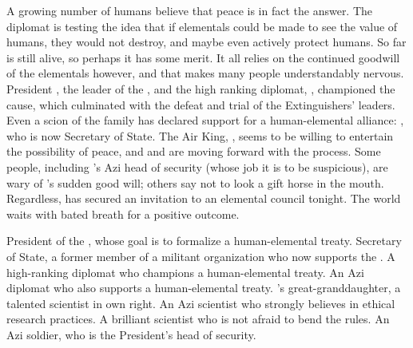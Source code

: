 \documentclass[blue]{elementals}
\begin{document}
A growing number of humans believe that peace is in fact the answer. The diplomat \cDiplomat{\full} is testing the idea that if elementals could be made to see the value of humans, they would not destroy, and maybe even actively protect humans.  So far \cDiplomat{} is still alive, so perhaps it has some merit. It all relies on the continued goodwill of the elementals however, and that makes many people understandably nervous. President \cLeader{\full}, the leader of the \cNewUN{\full}, and the high ranking diplomat, \cAvatar{\full}, championed the cause, which culminated with the defeat and trial of the Extinguishers' leaders. Even a scion of the \cDema{\formal} family has declared support for a human-elemental alliance: \cDema{}, who is now Secretary of State. The Air King, \cKing{}, seems to be willing to entertain the possibility of peace, and \cLeader{} and \cAvatar{} are moving forward with the process. Some people, including \cLeader{}'s Azi head of security \cRomeo{\full} (whose job it is to be suspicious), are wary of \cKing{}'s sudden good will; others say not to look a gift horse in the mouth. Regardless, \cLeader{} has secured an invitation to an elemental council tonight. The world waits with bated breath for a positive outcome.

\begin{members}
  \member{\cLeader{}} President of the \cNewUN{\full}, whose goal is to formalize a human-elemental treaty.
  \member{\cDema{}} Secretary of State, a former member of a militant organization who now supports the \cNewUN{\full}.
  \member{\cAvatar{}} A high-ranking diplomat who champions a human-elemental treaty.
  \member{\cDiplomat{}} An Azi diplomat who also supports a human-elemental treaty.
  \member{\cGD{}} \cGrandfather{\full}'s great-granddaughter, a talented scientist in \cGD{\their} own right. 
  \member{\cScientist{}} An Azi scientist who strongly believes in ethical research practices.
  \member{\cMS{}} A brilliant scientist who is not afraid to bend the rules.
  \member{\cRomeo{}} An Azi soldier, who is the President's head of security.
\end{members}
\end{document}
